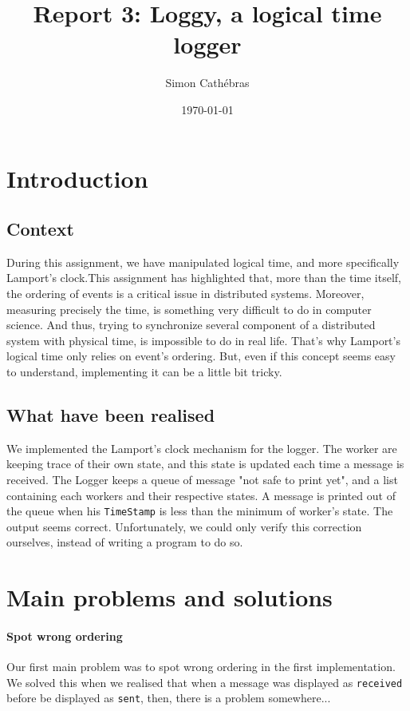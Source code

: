 \documentclass[a4paper, 11pt]{article}
\title{Report 3: Loggy, a logical time logger}
\author{Simon Cathébras}
\date{\today{}}
\begin{document}
\maketitle
\section{Introduction}

\subsection{Context}
During this assignment, we have manipulated logical time, and more specifically Lamport's clock.This assignment has highlighted that, more than the time itself, the ordering of events is a critical issue in distributed systems. Moreover, measuring precisely the time, is something very difficult to do in computer science. And thus, trying to synchronize several component of a distributed system with physical time, is impossible to do in real life. That's why Lamport's logical time only relies on event's ordering. But, even if this concept seems easy to understand, implementing it can be a little bit tricky. \\

\subsection{What have been realised}
We implemented the Lamport's clock mechanism for the logger. The worker are keeping trace of their own state, and this state is updated each time a message is received. The Logger keeps a queue of message "not safe to print yet", and a list containing each workers and their respective states. A message is printed out of the queue when his \lstinline!TimeStamp! is less than the minimum of worker's state.
The output seems correct. Unfortunately, we could only verify this correction ourselves, instead of writing a program to do so.

\section{Main problems and solutions}
\paragraph{Spot wrong ordering}
Our first main problem was to spot wrong ordering in the first implementation. We solved this when we realised that when a message was displayed as \lstinline!received! before be displayed as \lstinline!sent!, then, there is a problem somewhere...
\end{document}
